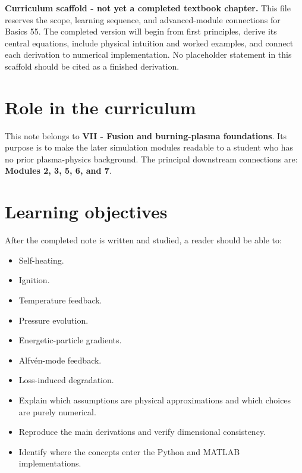 \documentclass[11pt]{article}
\begin{document}

\begin{overviewbox}
\textbf{Curriculum scaffold - not yet a completed textbook chapter.} This file reserves the scope, learning sequence, and advanced-module connections for Basics 55. The completed version will begin from first principles, derive its central equations, include physical intuition and worked examples, and connect each derivation to numerical implementation. No placeholder statement in this scaffold should be cited as a finished derivation.
\end{overviewbox}

\ProjectTOC

\section{Role in the curriculum}
This note belongs to \textbf{VII - Fusion and burning-plasma foundations}. Its purpose is to make the later simulation modules readable to a student who has no prior plasma-physics background. The principal downstream connections are: \textbf{Modules 2, 3, 5, 6, and 7}.

\section{Learning objectives}
After the completed note is written and studied, a reader should be able to:
\begin{itemize}[leftmargin=1.6em]
\item Self-heating.
\item Ignition.
\item Temperature feedback.
\item Pressure evolution.
\item Energetic-particle gradients.
\item Alfv\'en-mode feedback.
\item Loss-induced degradation.
\item Explain which assumptions are physical approximations and which choices are purely numerical.
\item Reproduce the main derivations and verify dimensional consistency.
\item Identify where the concepts enter the Python and MATLAB implementations.
\end{itemize}
\end{document}
